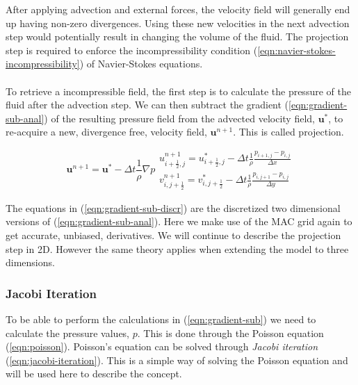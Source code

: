\documentclass[twocolumn]{article}
\begin{document}
After applying advection and external forces, the velocity field will generally end up having non-zero divergences. Using these new velocities in the next advection step would potentially result in changing the volume of the fluid. The projection step is required to enforce the incompressibility condition (\ref{eqn:navier-stokes-incompressibility}) of Navier-Stokes equations. 
\\\\
To retrieve a incompressible field, the first step is to calculate the pressure of the fluid after the advection step. We can then subtract the gradient (\ref{eqn:gradient-sub-anal}) of the resulting pressure field from the advected velocity field, $\mathbf{u}^{*}$, to re-acquire a new, divergence free, velocity field, $\mathbf{u}^{n+1}$. This is called projection.

\begin{subequations}
\begin{equation}
  \mathbf{u}^{n+1} = \mathbf{u}^{*} - \Delta t \frac{1}{\rho} \nabla p
    \label{eqn:gradient-sub-anal}
\end{equation}
\begin{equation}
\begin{split}
  u_{i+\frac{1}{2}, j}^{n+1} = u_{i+\frac{1}{2}, j}^{*} - \Delta t \frac{1}{\rho} \frac{p_{i+1, j} - p_{i, j}}{\Delta x}\\
    v_{i, j+\frac{1}{2}}^{n+1} = v_{i, j+\frac{1}{2}}^{*} - \Delta t \frac{1}{\rho} \frac{p_{i, j+1} - p_{i, j}}{\Delta y}
    \label{eqn:gradient-sub-discr}
\end{split}
\end{equation}
\label{eqn:gradient-sub}
\end{subequations}

The equations in (\ref{eqn:gradient-sub-discr}) are the discretized two dimensional versions of (\ref{eqn:gradient-sub-anal}). Here we make use of the MAC grid again to get  accurate, unbiased, derivatives. We will continue to describe the projection step in 2D. However the same theory applies when extending the model to three dimensions.

\subsubsection{Jacobi Iteration}
To be able to perform the calculations in (\ref{eqn:gradient-sub}) we need to calculate the pressure values, $p$. This is done through the Poisson equation (\ref{eqn:poisson}). Poisson's equation can be solved through \emph{Jacobi iteration} (\ref{eqn:jacobi-iteration}). This is a simple way of solving the Poisson equation and will be used here to describe the concept.
\end{document}
